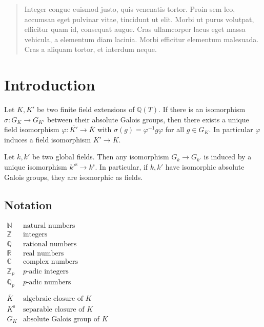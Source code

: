 \documentclass[11pt,a4paper,openany]{memoir}
\begin{document}
\vspace{1cm}

\renewcommand{\abstractname}{Zusammenfassung}
\begin{abstract}
Integer congue euismod justo, quis venenatis tortor. Proin sem leo, accumsan eget pulvinar vitae, tincidunt ut elit. Morbi ut purus volutpat, efficitur quam id, consequat augue. Cras ullamcorper lacus eget massa vehicula, a elementum diam lacinia. Morbi efficitur elementum malesuada. Cras a aliquam tortor, et interdum neque.
\end{abstract}
\vfill
\clearpage

\setcounter{page}{5}
\tableofcontents

\chapter{Introduction}

\begin{theorem}\label{thm:main-result}
Let $K,K'$ be two finite field extensions of $\mathbb{Q}(T)$. If there is an isomorphism $\sigma:G_K\to G_{K'}$ between their absolute Galois groups, then there exists a unique field isomorphism $\varphi:\overline{K'}\to\overline{K}$ with $\sigma(g)=\varphi^{-1}g\varphi$ for all $g\in G_K$. In particular $\varphi$ induces a field isomorphism $K'\to K$.
\end{theorem}

\begin{theorem}\label{thm:neukirch-uchida}
Let $k,k'$ be two global fields. Then any isomorphism $G_k\to G_{k'}$ is induced by a unique isomorphism $k'^{\text{s}}\to k^\text{s}$.  In particular, if $k,k'$ have isomorphic absolute Galois groups, they are isomorphic as fields.
\end{theorem}

\clearpage

\section{Notation}

$\begin{array}{ll}
\mathbb{N} & \text{natural numbers} \\
\mathbb{Z} & \text{integers}\\
\mathbb{Q} & \text{rational numbers}\\
\mathbb{R} & \text{real numbers}\\
\mathbb{C} & \text{complex numbers}\\
\mathbb{Z}_p & \text{$p$-adic integers}\\
\mathbb{Q}_p & \text{$p$-adic numbers}\\
\\
\overline{K} & \text{algebraic closure of $K$}\\
K^\text{s} & \text{separable closure of $K$}\\
G_K & \text{absolute Galois group of $K$}
\end{array}$
\end{document}
